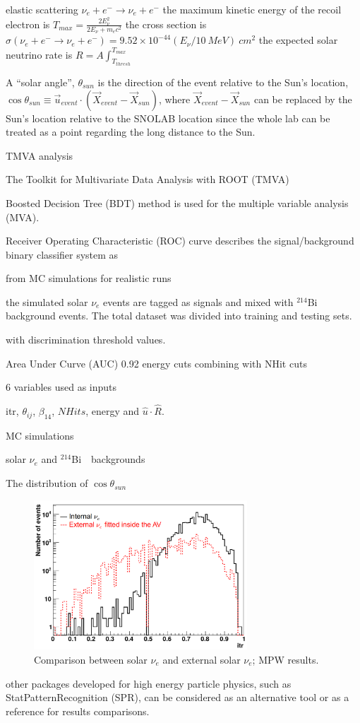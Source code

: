 elastic scattering $\nu_e+e^-\to \nu_e+e^-$
the maximum kinetic energy of the recoil electron is
$T_{max}=\frac{2E^2_\nu}{2E_\nu+m_e c^2}$
the cross section is $\sigma(\nu_e+e^-\to \nu_e+e^-)=9.52\times 10^{-44}(E_\nu/10~MeV)~cm^2$
the expected solar neutrino rate is 
$R=A\int_{T_{thresh}}^{T_{max}}$

A ``solar angle'', $\theta_{sun}$ is the direction of the event relative to the Sun's location,
$\cos\theta_{sun}\equiv \vec u_{event}\cdot (\vec{X}_{event}-\vec{X}_{sun})$, where $\vec{X}_{event}-\vec{X}_{sun}$ can be replaced by the Sun's location relative to the SNOLAB location since the whole lab can be treated as a point regarding the long distance to the Sun.




TMVA analysis

The Toolkit for Multivariate Data Analysis with ROOT (TMVA) \cite{tmvaWebsite,albertsson2007tmva}







Boosted Decision Tree (BDT) method is used for the multiple variable analysis (MVA).

Receiver Operating Characteristic (ROC) curve describes
the signal/background binary classifier system as 

from MC simulations for realistic runs

the simulated solar $\nu_e$ events are tagged as signals and mixed with $^{214}$Bi background events. The total dataset was divided into training and testing sets.

with discrimination threshold values. 

Area Under Curve (AUC) 0.92
energy cuts combining with NHit cuts


6 variables used as inputs

itr, $\theta_{ij}$, $\beta_{14}$, $NHits$, energy and $\hat u \cdot \hat R$.


MC simulations 

solar $\nu_e$ 
and $^{214}$Bi　backgrounds

The distribution of $\cos\theta_{sun}$




\begin{figure}[!htb]
	\centering
	\includegraphics[width=8cm]{ITR_MPW_solarNuVsExSolar.png}
	\caption{Comparison between solar $\nu_e$ and external solar $\nu_e$; MPW results.}
	\label{itrCmp}
\end{figure}






other packages developed for high energy particle physics, such as StatPatternRecognition (SPR)\cite{sprWebsite}, can be considered as an alternative tool or as a reference for results comparisons. 





